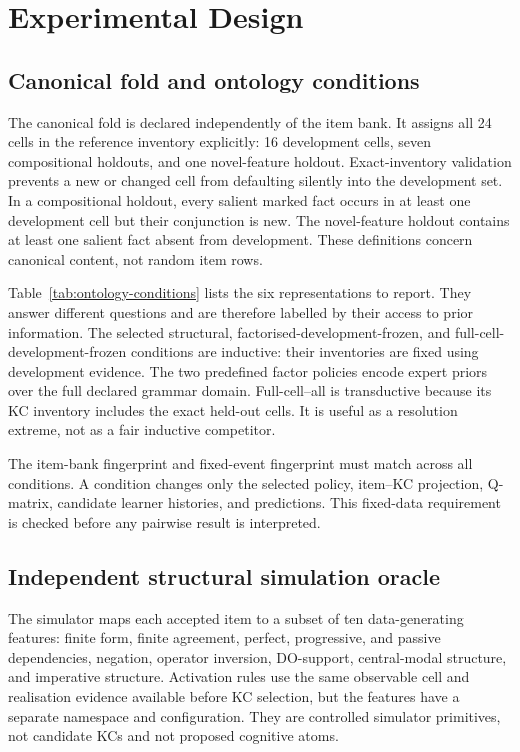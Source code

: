 \section{Experimental Design}
\label{sec:experimental-design}

\subsection{Canonical fold and ontology conditions}

The canonical fold is declared independently of the item bank.  It assigns
all 24 cells in the reference inventory explicitly: 16 development cells,
seven compositional holdouts, and one novel-feature holdout.  Exact-inventory
validation prevents a new or changed cell from defaulting silently into the
development set.  In a compositional holdout, every salient marked fact occurs
in at least one development cell but their conjunction is new.  The
novel-feature holdout contains at least one salient fact absent from
development.  These definitions concern canonical content, not random item
rows.

Table~\ref{tab:ontology-conditions} lists the six representations to report.
They answer different questions and are therefore labelled by their access to
prior information.  The selected structural, factorised-development-frozen,
and full-cell-development-frozen conditions are inductive: their inventories
are fixed using development evidence.  The two predefined factor policies
encode expert priors over the full declared grammar domain.  Full-cell--all is
transductive because its KC inventory includes the exact held-out cells.  It is
useful as a resolution extreme, not as a fair inductive competitor.



The item-bank fingerprint and fixed-event fingerprint must match across all
conditions.  A condition changes only the selected policy, item--KC
projection, Q-matrix, candidate learner histories, and predictions.  This
fixed-data requirement is checked before any pairwise result is interpreted.

\subsection{Independent structural simulation oracle}

The simulator maps each accepted item to a subset of ten data-generating
features: finite form, finite agreement, perfect, progressive, and passive
dependencies, negation, operator inversion, DO-support, central-modal
structure, and imperative structure.  Activation rules use the same observable
cell and realisation evidence available before KC selection, but the features
have a separate namespace and configuration.  They are controlled simulator
primitives, not candidate KCs and not proposed cognitive atoms.

